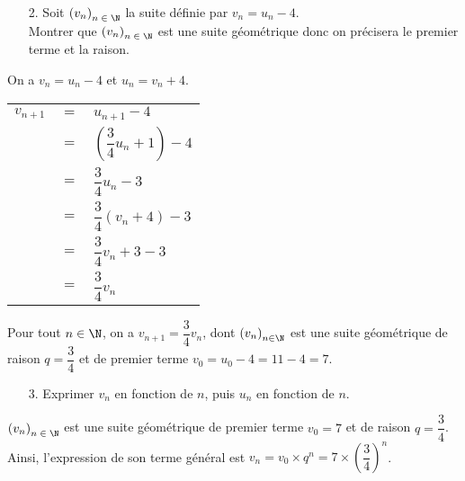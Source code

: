 \begin{itemize}
\item[2.] Soit $\left(v_n\right)_{n\; \in \; \N}$ la suite définie par $v_n = u_n - 4$. \\ Montrer que $\left(v_n\right)_{n\; \in \; \N}$ est une suite géométrique donc on précisera le premier terme et la raison.
\end{itemize}

\vspace*{.3cm}

On a $v_n = u_n - 4$ et $u_n = v_n + 4$. \\

\begin{tabular}{lll}
$v_{n+1}$ & $=$ & $u_{n+1} - 4$ \vspace*{.3cm} \\
& $=$ & $\left(\dfrac{3}{4}u_n + 1\right) - 4$ \vspace*{.3cm} \\
& $=$ & $\dfrac{3}{4}u_n - 3$ \vspace*{.3cm}
\\
& $=$ & $\dfrac{3}{4}\left(v_n + 4\right) - 3$ \vspace*{.3cm} \\
& $=$ & $\dfrac{3}{4}v_n + 3 - 3$ \vspace*{.3cm} \\
& $=$ & $\dfrac{3}{4}v_n$ \vspace*{.3cm} \\
\end{tabular}

\vspace*{.3cm}

Pour tout $n \in \N$, on a $v_{n+1} = \dfrac{3}{4}v_n$, dont $\left(v_n\right)_{n \in \N}$ est une suite géométrique de raison $q = \dfrac{3}{4}$ et de premier terme $v_0 = u_0 - 4 = 11 - 4 = 7$. \\

\begin{itemize}
\item[3.] Exprimer $v_n$ en fonction de $n$, puis $u_n$ en fonction de $n$. \\
\end{itemize}

$\left(v_n\right)_{n \; \in \; \N}$ est une suite géométrique de premier terme $v_0 =7$ et de raison $q =\dfrac{3}{4}$. \\

Ainsi, l'expression de son terme général est $v_n = v_0 \times q^n = 7 \times \left(\dfrac{3}{4}\right)^n$. \\

